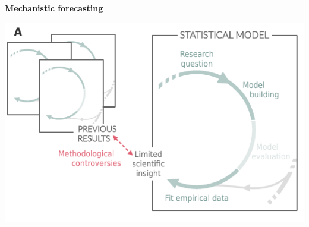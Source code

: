 \documentclass[11pt]{article}
\begin{document}
\begin{tcolorbox}
{\begin{multicols}{2}
\vfill

\columnbreak

\centerline{\bf Mechanistic forecasting}

\begin{minipage}[t]{\linewidth}
    \includegraphics[width=\linewidth]{figures/trendestimation_details}


\end{minipage}
\end{multicols}}
\end{tcolorbox}
\end{document}
